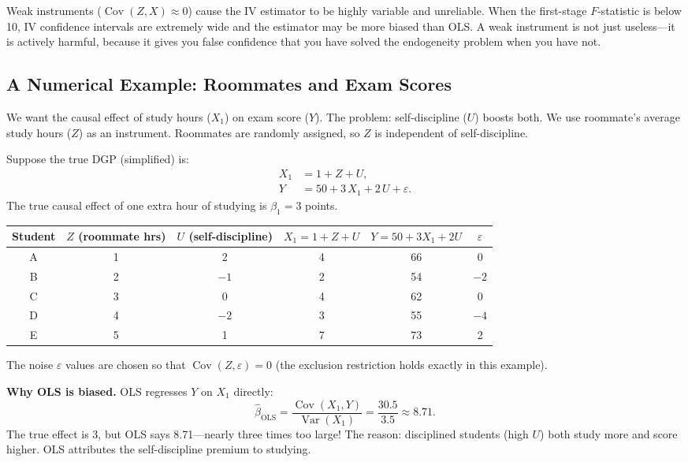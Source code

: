 \documentclass[11pt,a4paper]{article}
\theoremstyle{definition}
\theoremstyle{plain}
\theoremstyle{remark}
\newcommand{\Var}{\operatorname{Var}}
\newcommand{\Cov}{\operatorname{Cov}}
\newcommand{\bols}{\hat{\beta}_{\text{OLS}}}
\begin{document}
\begin{warningbox}
Weak instruments ($\Cov(Z, X) \approx 0$) cause the IV estimator to be highly variable and unreliable.
When the first-stage $F$-statistic is below 10, IV confidence intervals are extremely wide and the estimator may be more biased than OLS. A weak instrument is not just useless---it is actively harmful, because it gives you false confidence that you have solved the endogeneity problem when you have not.
\end{warningbox}

\subsection{A Numerical Example: Roommates and Exam Scores}

\begin{numermark}[title={Roommate Study Hours as an Instrument}]
We want the causal effect of study hours ($X_1$) on exam score ($Y$). The problem: self-discipline ($U$) boosts both. We use roommate's average study hours ($Z$) as an instrument. Roommates are randomly assigned, so $Z$ is independent of self-discipline.

Suppose the true DGP (simplified) is:
\begin{align*}
  X_1 &= 1 + Z + U, \\
  Y &= 50 + 3\,X_1 + 2\,U + \varepsilon.
\end{align*}
The true causal effect of one extra hour of studying is $\beta_1 = 3$ points.

\begin{center}
\begin{tabular}{@{}cccccc@{}}
\toprule
Student & $Z$ (roommate hrs) & $U$ (self-discipline) & $X_1 = 1+Z+U$ & $Y = 50+3X_1+2U$ & $\varepsilon$ \\
\midrule
A & 1 & 2 & 4 & 66 & 0 \\
B & 2 & $-1$ & 2 & 54 & $-2$ \\
C & 3 & 0 & 4 & 62 & 0 \\
D & 4 & $-2$ & 3 & 55 & $-4$ \\
E & 5 & 1 & 7 & 73 & 2 \\
\bottomrule
\end{tabular}
\end{center}

The noise $\varepsilon$ values are chosen so that $\Cov(Z, \varepsilon) = 0$ (the exclusion restriction holds exactly in this example).

\textbf{Why OLS is biased.} OLS regresses $Y$ on $X_1$ directly:
\[
  \bols = \frac{\Cov(X_1, Y)}{\Var(X_1)} = \frac{30.5}{3.5} \approx 8.71.
\]
The true effect is 3, but OLS says 8.71---nearly three times too large! The reason: disciplined students (high $U$) both study more and score higher. OLS attributes the self-discipline premium to studying.


\end{numermark}
\end{document}
